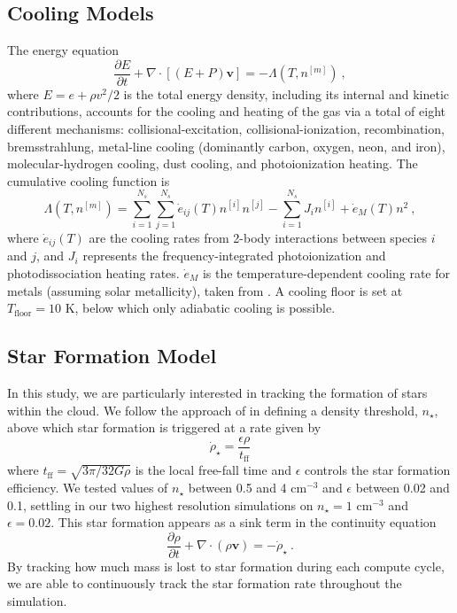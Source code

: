\documentclass{aastex6}
\begin{document}
\subsection{Cooling Models}

The energy equation 
\begin{equation}
\frac{\partial E}{\partial t} +\nabla \cdot [(E+P) \mathbf{v}]
        = -\Lambda(T,n^{[m]})~,
\label{eqn:dual_en}
\end{equation}
where $E = e + \rho v^2/2$ is the total energy density, including its internal and kinetic contributions, accounts for the cooling and heating of the gas via a total of eight different mechanisms: collisional-excitation, collisional-ionization,
recombination, bremsstrahlung, metal-line cooling (dominantly carbon, oxygen, neon, and iron), molecular-hydrogen cooling, dust cooling, and photoionization heating. The cumulative cooling function is
\begin{equation}
\Lambda(T,n^{[m]}) =
    \sum_{i=1}^{N_{s}} \sum_{j=1}^{N_{s}}  \dot{e}_{ij}(T) n^{[i]} n^{[j]}
    - \sum_{i=1}^{N_{s}} J_i n^{[i]}
    + \dot{e}_M(T) n^2 ~,
\label{eqn:coolingchem}
\end{equation}
where $\dot{e}_{ij}(T)$ are the cooling rates from 2-body interactions between species $i$ and $j$, and $J_i$ represents the frequency-integrated photoionization and photodissociation heating rates. $\dot{e}_M$ is the temperature-dependent cooling rate for metals (assuming solar metallicity), taken from \citet{Dalgarno72}. A cooling floor is set at $T_\mathrm{floor} = 10$ K, below which only adiabatic cooling is possible.


\subsection{Star Formation Model}

In this study, we are particularly interested in tracking the formation of stars within the cloud.  We follow the approach of \citet{Rasera06} in defining a density threshold, $n_\star$, above which star formation is triggered at a rate given by
\begin{equation} 	
\dot{\rho}_\star = \frac{\epsilon \rho}{t_\mathrm{ff}} 
\label{eqn:sfr} 
\end{equation}
where $t_\mathrm{ff} = \sqrt{3 \pi/32 G \rho}$ is the local free-fall time and $\epsilon$ controls the star formation efficiency. We tested values of $n_\star$ between 0.5 and 4 cm$^{-3}$ and $\epsilon$ between 0.02 and 0.1, settling in our two highest resolution simulations on $n_\star = 1$ cm$^{-3}$ and $\epsilon = 0.02$. This star formation appears as a sink term in the continuity equation
\begin{equation}
\frac{\partial \rho}{\partial t} +\nabla \cdot (\rho \mathbf{v}) = -\dot{\rho}_\star ~.
\label{eqn:dens}
\end{equation}
By tracking how much mass is lost to star formation during each compute cycle, we are able to continuously track the star formation rate throughout the simulation. 
\end{document}

